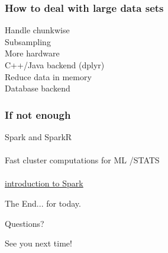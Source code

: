 \documentclass{beamer}
\begin{document}
\begin{frame}
	\frametitle{How to deal with large data sets}
	\begin{center}
		Handle chunkwise\\
		Subsampling\\
		More hardware\\
		C++/Java backend (dplyr)\\
		Reduce data in memory\\
		Database backend\\
	\end{center}
\end{frame}

\begin{frame}
	\frametitle{If not enough}
	\begin{center}
		Spark and SparkR\\~\\
		Fast cluster computations  for ML /STATS\\~\\
		\href{https://www.youtube.com/watch?v=_Ss1Cm6WO-I}
		{introduction to Spark}	\\
	\end{center}
\end{frame}


\begin{frame}
\Huge{\centerline{The End... for today.}}
\Huge{\centerline{Questions?}}
\Huge{\centerline{See you next time!}}
\end{frame}

\end{document}
